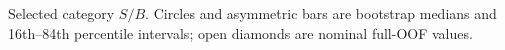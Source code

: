Selected category $S/B$. Circles and asymmetric bars are bootstrap medians and 16th--84th percentile intervals; open diamonds are nominal full-OOF values.
